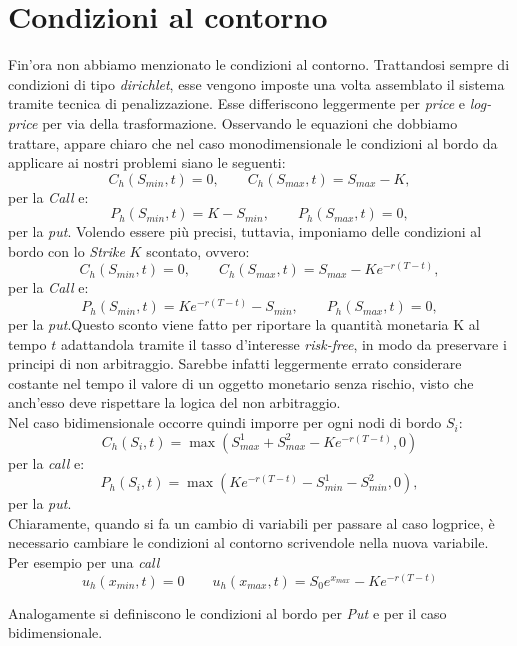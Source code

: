 \documentclass[a4paper,10pt]{report}
\theoremstyle{plain}
\theoremstyle{definition}
\theoremstyle{remark}
\begin{document}
\section{Condizioni al contorno}
Fin'ora non abbiamo menzionato le condizioni al contorno. Trattandosi sempre di condizioni di tipo \emph{dirichlet}, esse vengono imposte una volta assemblato il sistema tramite tecnica di penalizzazione. Esse differiscono leggermente per \emph{price} e \emph{log-price} per via della trasformazione. Osservando le equazioni che dobbiamo trattare, appare chiaro che nel caso monodimensionale le condizioni al bordo da applicare ai nostri problemi siano le seguenti: $$C_h(S_{min},t)=0, \qquad C_h(S_{max},t)=S_{max}-K,$$ per la \emph{Call} e: $$P_h(S_{min},t)=K-S_{min}, \qquad P_h(S_{max},t)=0,$$ per la \emph{put}. Volendo essere pi\`u precisi, tuttavia, imponiamo delle condizioni al bordo con lo \emph{Strike} $K$ scontato, ovvero: $$C_h(S_{min},t)=0, \qquad C_h(S_{max},t)=S_{max}-Ke^{-r(T-t)},$$ per la \emph{Call} e: $$P_h(S_{min},t)=Ke^{-r(T-t)}-S_{min}, \qquad P_h(S_{max},t)=0,$$ per la \emph{put}.Questo sconto viene fatto per riportare la quantità monetaria K al tempo $t$ adattandola tramite il tasso d'interesse \emph{risk-free}, in modo da preservare i principi di non arbitraggio. Sarebbe infatti leggermente errato considerare costante nel tempo il valore di un oggetto monetario senza rischio, visto che anch'esso deve rispettare la logica del non arbitraggio.\\Nel caso bidimensionale occorre quindi imporre per ogni nodi di bordo $S_i$: $$C_h(S_i,t)=\max\left(S^1_{max}+S^2_{max}-Ke^{-r(T-t)},0\right)$$per la \emph{call} e: $$P_h(S_i,t)=\max\left(Ke^{-r(T-t)}-S^1_{min}-S^2_{min},0\right),$$ per la \emph{put}.\\
Chiaramente, quando si fa un cambio di variabili per passare al caso logprice, è necessario cambiare le condizioni al contorno scrivendole nella nuova variabile. Per esempio per una \emph{call}
\begin{equation*}
 u_h(x_{min},t)=0 \qquad u_h(x_{max},t)=S_0 e^{x_{max}}-Ke^{-r(T-t)}
\end{equation*}

Analogamente si definiscono le condizioni al bordo per \emph{Put} e per il caso bidimensionale.

\end{document}
